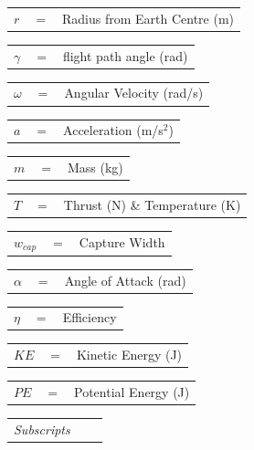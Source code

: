 \begin{tabular}{p{0.8cm}p{0.8cm}p{5.6cm}}
	
	
	$r$ & $=$ & Radius from Earth Centre (m)\\
\end{tabular} 
\begin{tabular}{p{0.8cm}p{0.8cm}p{5.6cm}}
	$\gamma$ & $=$ & flight path angle (rad)\\
\end{tabular} 
\begin{tabular}{p{0.8cm}p{0.8cm}p{5.6cm}}
	$\omega$ & $=$ & Angular Velocity (rad/s)\\
\end{tabular} 
\begin{tabular}{p{0.8cm}p{0.8cm}p{5.6cm}}
	$a$ & $=$ & Acceleration (m/s$^2$)\\
\end{tabular} 
\begin{tabular}{p{0.8cm}p{0.8cm}p{5.6cm}}
	$m$ & $=$ & Mass (kg)\\
\end{tabular} 
\begin{tabular}{p{0.8cm}p{0.8cm}p{5.6cm}}
	$T$ & $=$ & Thrust (N) \& Temperature (K)\\
\end{tabular} 
\begin{tabular}{p{0.8cm}p{0.8cm}p{5.6cm}}
	$w_{cap}$ & $=$ & Capture Width\\
\end{tabular} 
\begin{tabular}{p{0.8cm}p{0.8cm}p{5.6cm}}
	$\alpha$ & $=$ & Angle of Attack (rad)\\
\end{tabular} 	
\begin{tabular}{p{0.8cm}p{0.8cm}p{5.6cm}}
	$\eta$ & $=$ & Efficiency\\
\end{tabular} 	
\begin{tabular}{p{0.8cm}p{0.8cm}p{5.6cm}}
	$KE$ & $=$ & Kinetic Energy (J)\\
\end{tabular} 
\begin{tabular}{p{0.8cm}p{0.8cm}p{5.6cm}}
	$PE$ & $=$ & Potential Energy (J)\\
\end{tabular} 
\newline  	
\begin{tabular}{p{5.2cm}p{1cm}p{5cm}}

	\textit{Subscripts} \\
\end{tabular} 
